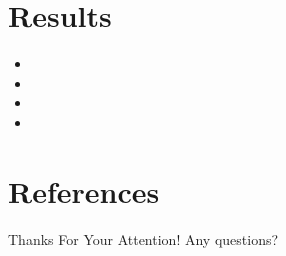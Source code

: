 \documentclass{article}
\begin{document}
\section{Results}
\begin{frame}
    \begin{itemize}
        \item \lipsum[4][1-4]
        \item \lipsum[4][5-9]
        \item \lipsum[5][1-4]
        \item \lipsum[5][5-8]
    \end{itemize}
\end{frame}

\section{References}

\begin{frame}[allowframebreaks]
    
    
    \nocite{*} %
\end{frame}


\begin{frame}
    \begin{center}
        {\Huge\calligra Thanks For Your Attention!}
        Any questions?
    \end{center}
\end{frame}
\end{document}
